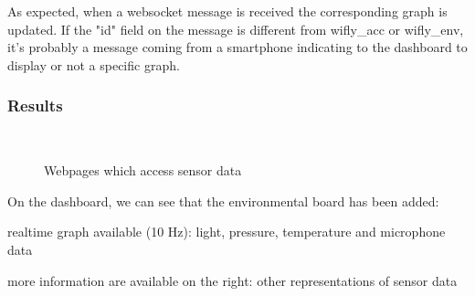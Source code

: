 \documentclass[pdftex,10pt,a4paper]{report}
\newenvironment{packed_item}{
\begin{itemize}
  \setlength{\itemsep}{1pt}
  \setlength{\parskip}{0pt}
  \setlength{\parsep}{0pt}
}{\end{itemize}}
\begin{document}
As expected, when a websocket message is received the corresponding graph is updated. If the "id" field on the message is different from wifly\_acc or wifly\_env, it's probably a message coming from a smartphone indicating to the dashboard to display or not a specific graph. 

\subsubsection{Results}

\begin{figure}[htp]
  \centering
   \\
  \caption{Webpages which access sensor data}
  \label{fig:contour}
\end{figure}

On the dashboard, we can see that the environmental board has been added:
\begin{packed_item}
	\item realtime graph available (10 Hz): light, pressure, temperature and microphone data
	\item more information are available on the right: other representations of sensor data
\end{packed_item}
\end{document}
